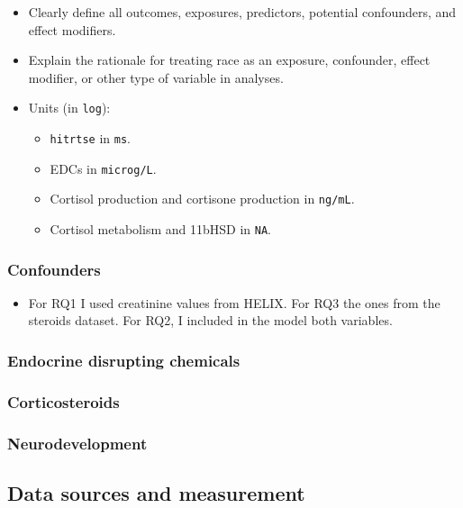 \documentclass[
  letterpaper,
  DIV=11,
  numbers=noendperiod]{scrartcl}
\providecommand{\tightlist}{%
  \setlength{\itemsep}{0pt}\setlength{\parskip}{0pt}}\usepackage{longtable,booktabs,array}
\begin{document}
\begin{itemize}
\item
  Clearly define all outcomes, exposures, predictors, potential
  confounders, and effect modifiers.
\item
  Explain the rationale for treating race as an exposure, confounder,
  effect modifier, or other type of variable in analyses.
\item
  Units (in \texttt{log}):

  \begin{itemize}
  \tightlist
  \item
    \texttt{hitrtse} in \texttt{ms}.
  \item
    EDCs in \texttt{microg/L}.
  \item
    Cortisol production and cortisone production in \texttt{ng/mL}.
  \item
    Cortisol metabolism and 11bHSD in \texttt{NA}.
  \end{itemize}
\end{itemize}

\subsubsection{Confounders}\label{sec-confounders}

\begin{itemize}
\tightlist
\item
  For RQ1 I used creatinine values from HELIX. For RQ3 the ones from the
  steroids dataset. For RQ2, I included in the model both variables.
\end{itemize}

\subsubsection{Endocrine disrupting chemicals}\label{sec-edcs}

\subsubsection{Corticosteroids}\label{sec-steroids}

\subsubsection{Neurodevelopment}\label{sec-neurodevelopment}

\subsection{Data sources and measurement}\label{sec-dat-sources}
\end{document}
